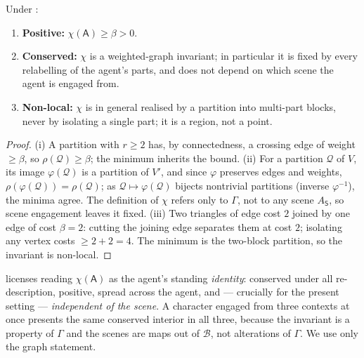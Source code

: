 \documentclass[11pt,twocolumn,a4paper]{article}
\newcommand{\Agent}{\mathsf{A}}
\newcommand{\Self}{\Gamma}          %
\newcommand{\V}{V}
\newcommand{\floorc}{\beta}          %
\newcommand{\Char}{\chi}             %
\newcommand{\Beh}{\mathcal{B}}       %
\newcommand{\Scene}{\mathsf{S}}      %
\begin{document}
\begin{theorem}
\label{thm:identity}
Under :
\begin{enumerate}[label=\textup{(\roman*)},leftmargin=2.2em]
\item \textbf{Positive:} $\Char(\Agent)\ge\floorc>0$.
\item \textbf{Conserved:} $\Char$ is a weighted-graph invariant; in
particular it is fixed by every relabelling of the agent's parts, and does
not depend on which scene the agent is engaged from.
\item \textbf{Non-local:} $\Char$ is in general realised by a partition
into multi-part blocks, never by isolating a single part; it is a region,
not a point.
\end{enumerate}
\end{theorem}

\begin{proof}
(i) A partition with $r\ge2$ has, by connectedness, a crossing edge of
weight $\ge\floorc$, so $\rho(\mathcal{Q})\ge\floorc$; the minimum
inherits the bound. (ii) For a partition $\mathcal{Q}$ of $\V$, its image
$\varphi(\mathcal{Q})$ is a partition of $\V'$, and since $\varphi$
preserves edges and weights, $\rho(\varphi(\mathcal{Q}))=\rho(\mathcal{Q})$;
as $\mathcal{Q}\mapsto\varphi(\mathcal{Q})$ bijects nontrivial partitions
(inverse $\varphi^{-1}$), the minima agree. The definition of $\Char$
refers only to $\Self$, not to any scene $A_\Scene$, so scene engagement
leaves it fixed. (iii) Two triangles of edge cost $2$ joined by one edge
of cost $\floorc=2$: cutting the joining edge separates them at cost $2$;
isolating any vertex costs $\ge2+2=4$. The minimum is the two-block
partition, so the invariant is non-local.
\end{proof}

\begin{remark}
\label{rem:character}
 licenses reading $\Char(\Agent)$ as the agent's
standing \emph{identity}: conserved under all re-description, positive,
spread across the agent, and --- crucially for the present setting ---
\emph{independent of the scene}. A character engaged from three contexts
at once presents the same conserved interior in all three, because the
invariant is a property of $\Self$ and the scenes are maps out of $\Beh$,
not alterations of $\Self$. We use only the graph statement.
\end{remark}
\end{document}
